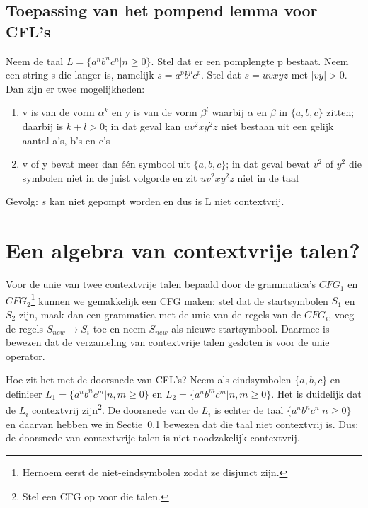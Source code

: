 \subsection{Toepassing van het pompend lemma voor CFL's}\label{voorbeeldpompcfl}

Neem de taal $L = \{a^nb^nc^n | n \geq 0\}$. Stel dat er een pomplengte p
bestaat. Neem een string s die langer is, namelijk $s = a^pb^pc^p$.
Stel dat $s = uvxyz$ met $|vy| > 0$. Dan zijn er twee mogelijkheden:
\begin{enumerate}
\item
v is van de vorm $\alpha^k$ en y is van de vorm $\beta^l$ waarbij
$\alpha$ en $\beta$ in $\{a,b,c\}$ zitten; daarbij is $k+l > 0$; in
dat geval kan $uv^2xy^2z$ niet bestaan uit een gelijk aantal a's, b's
en c's

\item
v of y bevat meer dan \'{e}\'{e}n symbool uit $\{a,b,c\}$; in dat
geval bevat $v^2$ of $y^2$ die symbolen niet in de juist volgorde en
zit $uv^2xy^2z$ niet in de taal

\end{enumerate}

Gevolg: $s$ kan niet gepompt worden en dus is L niet contextvrij.


\clearpage
\section{Een algebra van contextvrije talen?}

Voor de unie van twee contextvrije talen bepaald door de grammatica's
$CFG_1$ en $CFG_2$\footnote{Hernoem eerst de niet-eindsymbolen zodat ze
disjunct zijn.} kunnen we gemakkelijk een CFG maken: stel dat de
startsymbolen $S_1$ en $S_2$ zijn, maak dan een grammatica met de unie
van de regels van de $CFG_i$, voeg de regels $S_{new} \rightarrow S_i$
toe en neem $S_{new}$ als nieuwe startsymbool. Daarmee is bewezen dat
de verzameling van contextvrije talen gesloten is voor de unie operator.


Hoe zit het met de doorsnede van CFL's? Neem als eindsymbolen
$\{a,b,c\}$ en definieer $L_1 = \{a^nb^nc^m|n,m \geq 0\}$ en
$L_2 = \{a^nb^mc^m|n,m \geq 0\}$. Het is duidelijk dat de $L_i$
contextvrij zijn\footnote{Stel een CFG op voor die talen.}. De
doorsnede van de $L_i$ is echter de taal $\{a^nb^nc^n|n \geq 0\}$ en
daarvan hebben we in Sectie~\ref{voorbeeldpompcfl} bewezen dat die taal niet
contextvrij is. Dus: de doorsnede van contextvrije talen is niet
noodzakelijk contextvrij.  

